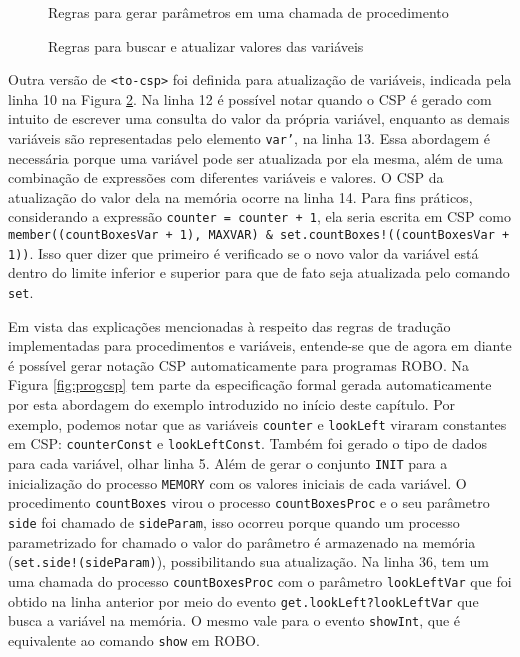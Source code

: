 \begin{figure}[h]
\centering
\caption{Regras para gerar parâmetros em uma chamada de procedimento}

\label{fig:rules_param}
\end{figure}

\begin{figure}[h]
\centering
\caption{Regras para buscar e atualizar valores das variáveis}

\label{fig:rules_var}
\end{figure}

Outra versão de \texttt{<to-csp>} foi definida para atualização de variáveis, indicada pela linha 10 na Figura \ref{fig:rules_var}. Na linha 12 é possível notar quando o CSP é gerado com intuito de escrever uma consulta do valor da própria variável, enquanto as demais variáveis são representadas pelo elemento \texttt{var'}, na linha 13. Essa abordagem é necessária porque uma variável pode ser atualizada por ela mesma, além de uma combinação de expressões com diferentes variáveis e valores. O CSP da atualização do valor dela na memória ocorre na linha 14. Para fins práticos, considerando a expressão \texttt{counter = counter + 1}, ela seria escrita em CSP como \texttt{member((countBoxesVar + 1), MAXVAR) \& set.countBoxes!((countBoxesVar + 1))}. Isso quer dizer que primeiro é verificado se o novo valor da variável está dentro do limite inferior e superior para que de fato seja atualizada pelo comando \texttt{set}.

Em vista das explicações mencionadas à respeito das regras de tradução implementadas para procedimentos e variáveis, entende-se que de agora em diante é possível gerar notação CSP automaticamente para programas ROBO. Na Figura \ref{fig:progcsp} tem parte da especificação formal gerada automaticamente por esta abordagem do exemplo introduzido no início deste capítulo. Por exemplo, podemos notar que as variáveis \texttt{counter} e \texttt{lookLeft} viraram constantes em CSP: \texttt{counterConst} e \texttt{lookLeftConst}. Também foi gerado o tipo de dados para cada variável, olhar linha 5. Além de gerar o conjunto \texttt{INIT} para a inicialização do processo \texttt{MEMORY} com os valores iniciais de cada variável. O procedimento \texttt{countBoxes} virou o processo \texttt{countBoxesProc} e o seu parâmetro \texttt{side} foi chamado de \texttt{sideParam}, isso ocorreu porque quando um processo parametrizado for chamado o valor do parâmetro é armazenado na memória (\texttt{set.side!(sideParam)}), possibilitando sua atualização. Na linha 36, tem um uma chamada do processo \texttt{countBoxesProc} com o parâmetro \texttt{lookLeftVar} que foi obtido na linha anterior por meio do evento \texttt{get.lookLeft?lookLeftVar} que busca a variável na memória. O mesmo vale para o evento \texttt{showInt}, que é equivalente ao comando \texttt{show} em ROBO.

